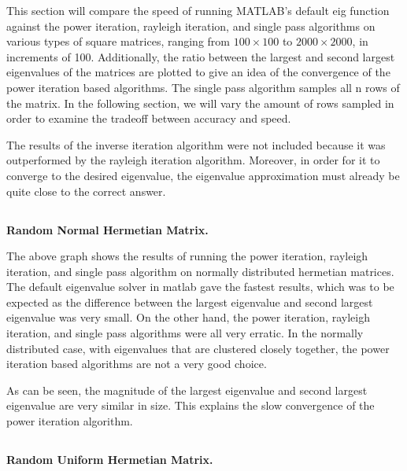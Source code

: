 \documentclass[11pt]{amsart}
\begin{document}
This section will compare the speed of running MATLAB's default eig function against the power iteration, rayleigh iteration, and single pass algorithms on various types of square matrices, ranging from $100 \times 100$ to $ 2000 \times 2000$, in increments of 100. Additionally, the ratio between the largest and second largest eigenvalues of the matrices are plotted to give an idea of the convergence of the power iteration based algorithms. The single pass algorithm samples all n rows of the matrix. In the following section, we will vary the amount of rows sampled in order to examine the tradeoff between accuracy and speed. 

The results of the inverse iteration algorithm were not included because it was outperformed by the rayleigh iteration algorithm. Moreover, in order for it to converge to the desired eigenvalue, the eigenvalue approximation must already be quite close to the correct answer.

\subsection{} \textbf{Random Normal Hermetian Matrix.}

\begin{center}
\end{center}

The above graph shows the results of running the power iteration, rayleigh iteration, and single pass algorithm on normally distributed hermetian matrices. The default eigenvalue solver in matlab gave the fastest results, which was to be expected as the difference between the largest eigenvalue and second largest eigenvalue was very small. On the other hand, the power iteration, rayleigh iteration, and single pass algorithms were all very erratic. In the normally distributed case, with eigenvalues that are clustered closely together, the power iteration based algorithms are not a very good choice.

\begin{center}
\end{center}

As can be seen, the magnitude of the largest eigenvalue and second largest eigenvalue are very similar in size. This explains the slow convergence of the power iteration algorithm.

\subsection{} \textbf{Random Uniform Hermetian Matrix.}
\end{document}

